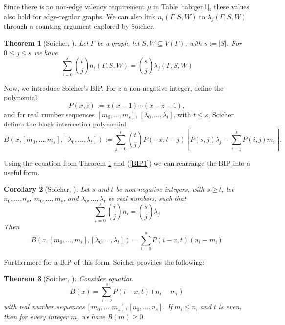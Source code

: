 \documentclass[11pt, baustms]{amsproc}
\theoremstyle{scplain}
\newtheorem{theorem}{Theorem}[section]
\newtheorem{corollary}[theorem]{Corollary}
\renewcommand\le{\leqslant}
\renewcommand\ge{\geqslant}
\begin{document}
Since there is no non-edge valency requirement $\mu$ in Table \ref{tab:gen1}, these values also hold for edge-regular graphs. 
We can also link $n_i (\Gamma, S, W )$ to $\lambda_j (\Gamma, S, W)$ through a counting argument explored by Soicher.

    \begin{theorem}[Soicher, {\cite[Theorem 2.1]{soicher_more_2010}}]
    \label{counts}
    Let $\Gamma$ be a graph, let $S, W \subseteq V(\Gamma)$, with $s:=|S|$. For $0 \le j \le s$ we have
    \begin{equation*}
        \sum^s_{i=0} \binom{i}{j} n_i (\Gamma, S, W ) = \binom{s}{j}\lambda_j (\Gamma, S, W)
    \end{equation*}
    \end{theorem}
    
Now, we introduce Soicher's BIP. For $z$ a non-negative integer, define the polynomial 
\[
P(x,z) := x(x -1) \cdots (x-z + 1),
\]
and for real number sequences $[m_0, \dots ,m_s]$, $[\lambda_0, \dots , \lambda_t ]$, with $t \le s$, Soicher defines the block intersection polynomial
	\begin{equation}
        \label{BIP1}
	    B(x, [m_0, \dots ,m_s], [\lambda_0, \dots , \lambda_t ]) :=
\sum^t_{j=0}\binom{t}{j} P(-x, t - j) \left[P(s, j)\lambda_j - \sum^s_{i=j}P(i, j)m_i\right].
	\end{equation}
	
	Using the equation from Theorem \ref{counts} and (\ref{BIP1}) we can rearrange the BIP into a useful form. 

    \begin{corollary}[Soicher, {\cite[Theorem 3.1]{soicher_more_2010}}]
    \label{rearranged}
        Let $s$ and $t$ be non-negative integers, with $s \ge t$, let $n_0, \dots ,n_s$, $m_0, \dots ,m_s$, and $\lambda_0, \dots , \lambda_t$ be
real numbers, such that 
\begin{equation*}
        \sum^s_{i=0} \binom{i}{j} n_i = \binom{s}{j}\lambda_j 
\end{equation*} 
      Then  \begin{equation*} B(x, [m_0, \dots ,m_s], [\lambda_0, \dots , \lambda_t ]) = \sum_{i=0}^s P(i-x,t)(n_i -m_i)\end{equation*}
    \end{corollary}

    Furthermore for a BIP of this form, Soicher provides the following:

    \begin{theorem}[Soicher, {\cite[Theorem 3.1]{soicher_more_2010}}]
    \label{reform}
        Consider equation \begin{equation*} B(x) = \sum_{i=0}^s P(i-x,t)(n_i -m_i)\end{equation*} with real number sequences $[m_0, \dots ,m_s], [n_0, \dots ,n_s]$. If $m_i \le n_i$ and $t$ is even, then for every integer $m$, we have $B(m) \ge 0$.
    \end{theorem}
    
\end{document}
